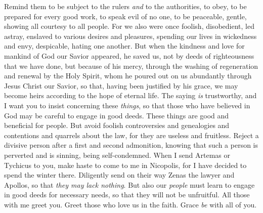 \begin{biblechapter} %
 Remind them to be subject to the rulers \textit{and} to the authorities, to obey, to be prepared for every good work,
\verse to speak evil of no one, to be peaceable, gentle, showing all courtesy to all people.
\verse For we also were once foolish, disobedient, led astray, enslaved to various desires and pleasures, spending our lives in wickedness and envy, despicable, hating one another.
\verse But when the kindness and love for mankind of God our Savior appeared,
\verse he saved us, not by deeds of righteousness that we have done, but because of his mercy, through the washing of regeneration and renewal by the Holy Spirit,
\verse whom he poured out on us abundantly through Jesus Christ our Savior,
\verse so that, having been justified by his grace, we may become heirs according to the hope of eternal life.
 The saying \textit{is} trustworthy, and I want you to insist concerning these \textit{things}, so that those who have believed in God may be careful to engage in good deeds. These things are good and beneficial for people.
\verse But avoid foolish controversies and genealogies and contentions and quarrels about the law, for they are useless and fruitless.
\verse Reject a divisive person after a first and second admonition,
\verse knowing that such a person is perverted and is sinning, being self-condemned.
\verse When I send Artemas or Tychicus to you, make haste to come to me in Nicopolis, for I have decided to spend the winter there.
\verse Diligently send on their way Zenas the lawyer and Apollos, so that \textit{they may lack nothing}.
\verse But also our \textit{people} must learn to engage in good deeds for necessary needs, so that they will not be unfruitful.
\verse All those with me greet you. Greet those who love us in the faith. Grace \textit{be} with all of you.
\end{biblechapter}

